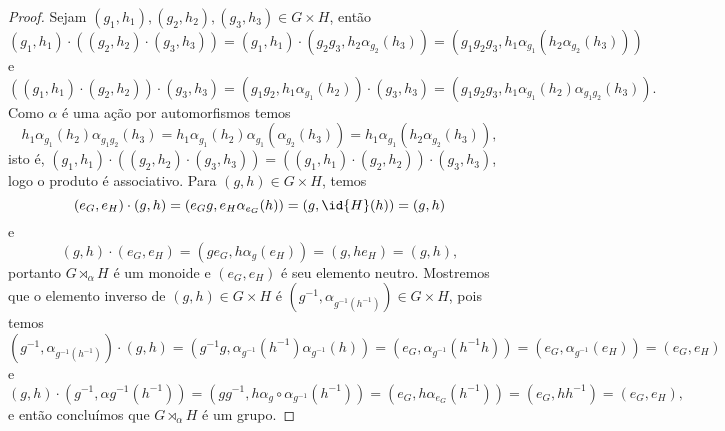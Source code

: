 \begin{proof}
    Sejam \( (g_1, h_1), (g_2, h_2), (g_3, h_3) \in G \times H\), então
    \begin{equation*}
        (g_1, h_1) \cdot \left((g_2, h_2)\cdot (g_3,h_3)\right) = (g_1,h_1) \cdot \left(g_2g_3, h_2 \alpha_{g_2}(h_3)\right) = \left(g_1 g_2 g_3, h_1 \alpha_{g_1}( h_2 \alpha_{g_2}(h_3))\right)
    \end{equation*}
    e
    \begin{equation*}
        \left((g_1, h_1)\cdot (g_2,h_2)\right) \cdot  (g_3, h_3) = \left(g_1 g_2, h_1 \alpha_{g_1}(h_2)\right) \cdot (g_3, h_3) = \left(g_1 g_2 g_3, h_1 \alpha_{g_1}(h_2) \alpha_{g_1 g_2}(h_3)\right).
    \end{equation*}
    Como \(\alpha\) é uma ação por automorfismos temos
    \begin{equation*}
        h_1 \alpha_{g_1}(h_2)\alpha_{g_1 g_2}(h_3) = h_1 \alpha_{g_1}(h_2) \alpha_{g_1}\left(\alpha_{g_2} (h_3)\right) = h_1 \alpha_{g_1}\left(h_2 \alpha_{g_2}(h_3)\right),
    \end{equation*}
    isto é, \((g_1, h_1) \cdot \left((g_2, h_2)\cdot (g_3,h_3)\right) =\left((g_1, h_1)\cdot (g_2,h_2)\right) \cdot  (g_3, h_3)\), logo o produto é associativo. Para \((g, h) \in G \times H\), temos
    \begin{equation*}
        (e_G, e_H)\cdot (g, h) = (e_Gg, e_H \alpha_{e_G}(h)) = \left(g, \id{H}(h)\right) = (g, h)
    \end{equation*}
    e
    \begin{equation*}
        (g,h)\cdot (e_G, e_H) = (g e_G, h \alpha_{g}(e_H)) = (g, h e_H) = (g,h),
    \end{equation*}
    portanto \(G \rtimes_{\alpha} H\) é um monoide e \((e_G, e_H)\) é seu elemento neutro. Mostremos que o elemento inverso de \((g, h) \in G \times H\) é \(\left(g^{-1}, \alpha_{g^{-1}(h^{-1})}\right) \in G \times H\), pois temos
    \begin{equation*}
        \left(g^{-1}, \alpha_{g^{-1}(h^{-1})}\right)\cdot(g, h) = \left(g^{-1}g, \alpha_{g^{-1}}(h^{-1}) \alpha_{g^{-1}}(h)\right) = \left(e_G, \alpha_{g^{-1}}(h^{-1} h)\right) = \left(e_G, \alpha_{g^{-1}}(e_H)\right) = (e_G, e_H)
    \end{equation*}
    e
    \begin{equation*}
        (g, h) \cdot \left(g^{-1}, \alpha{g^{-1}}(h^{-1})\right) = \left(gg^{-1}, h \alpha_{g}\circ \alpha_{g^{-1}}(h^{-1})\right) = \left(e_G, h \alpha_{e_G}(h^{-1})\right) = (e_G, h h^{-1}) = (e_G, e_H),
    \end{equation*}
    e então concluímos que \(G \rtimes_{\alpha} H\) é um grupo.
\end{proof}
